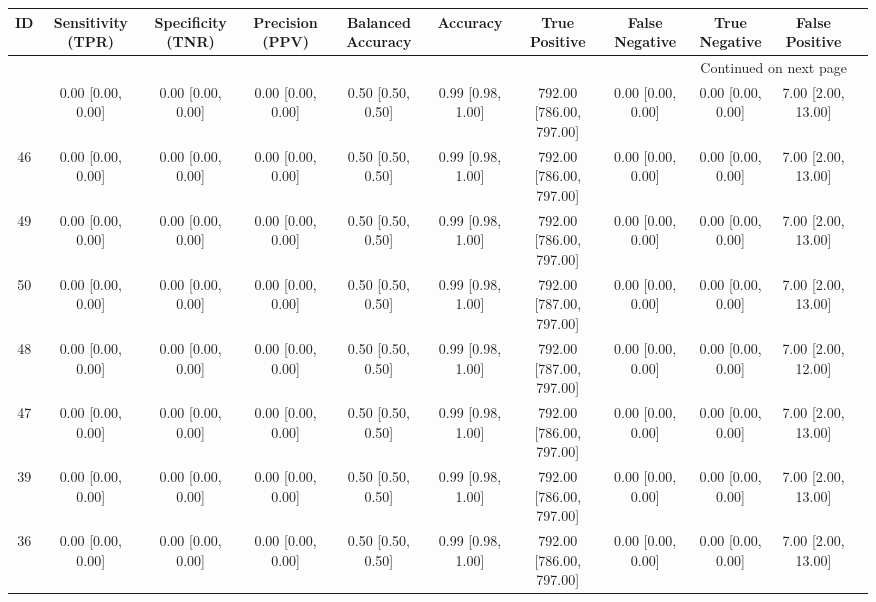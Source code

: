 \documentclass[8pt]{article}
\begin{document}
\begin{center}
\begin{footnotesize}
\begin{longtable}{|ccccccccccc|}
\toprule
 ID &  Sensitivity (TPR) &  Specificity (TNR) &    Precision (PPV) &  Balanced Accuracy &           Accuracy &            True Positive &        False Negative &      True Negative &      False Positive \\
\midrule
\endhead
\midrule
\multicolumn{10}{r}{{Continued on next page}} \\
\midrule
\endfoot

\bottomrule
\endlastfoot
 45 &  0.00 [0.00, 0.00] &  0.00 [0.00, 0.00] &  0.00 [0.00, 0.00] &  0.50 [0.50, 0.50] &  0.99 [0.98, 1.00] &  792.00 [786.00, 797.00] &     0.00 [0.00, 0.00] &  0.00 [0.00, 0.00] &  7.00 [2.00, 13.00] \\
 46 &  0.00 [0.00, 0.00] &  0.00 [0.00, 0.00] &  0.00 [0.00, 0.00] &  0.50 [0.50, 0.50] &  0.99 [0.98, 1.00] &  792.00 [786.00, 797.00] &     0.00 [0.00, 0.00] &  0.00 [0.00, 0.00] &  7.00 [2.00, 13.00] \\
 49 &  0.00 [0.00, 0.00] &  0.00 [0.00, 0.00] &  0.00 [0.00, 0.00] &  0.50 [0.50, 0.50] &  0.99 [0.98, 1.00] &  792.00 [786.00, 797.00] &     0.00 [0.00, 0.00] &  0.00 [0.00, 0.00] &  7.00 [2.00, 13.00] \\
 50 &  0.00 [0.00, 0.00] &  0.00 [0.00, 0.00] &  0.00 [0.00, 0.00] &  0.50 [0.50, 0.50] &  0.99 [0.98, 1.00] &  792.00 [787.00, 797.00] &     0.00 [0.00, 0.00] &  0.00 [0.00, 0.00] &  7.00 [2.00, 13.00] \\
 48 &  0.00 [0.00, 0.00] &  0.00 [0.00, 0.00] &  0.00 [0.00, 0.00] &  0.50 [0.50, 0.50] &  0.99 [0.98, 1.00] &  792.00 [787.00, 797.00] &     0.00 [0.00, 0.00] &  0.00 [0.00, 0.00] &  7.00 [2.00, 12.00] \\
 47 &  0.00 [0.00, 0.00] &  0.00 [0.00, 0.00] &  0.00 [0.00, 0.00] &  0.50 [0.50, 0.50] &  0.99 [0.98, 1.00] &  792.00 [786.00, 797.00] &     0.00 [0.00, 0.00] &  0.00 [0.00, 0.00] &  7.00 [2.00, 13.00] \\
 39 &  0.00 [0.00, 0.00] &  0.00 [0.00, 0.00] &  0.00 [0.00, 0.00] &  0.50 [0.50, 0.50] &  0.99 [0.98, 1.00] &  792.00 [786.00, 797.00] &     0.00 [0.00, 0.00] &  0.00 [0.00, 0.00] &  7.00 [2.00, 13.00] \\
 36 &  0.00 [0.00, 0.00] &  0.00 [0.00, 0.00] &  0.00 [0.00, 0.00] &  0.50 [0.50, 0.50] &  0.99 [0.98, 1.00] &  792.00 [786.00, 797.00] &     0.00 [0.00, 0.00] &  0.00 [0.00, 0.00] &  7.00 [2.00, 13.00] \\

\end{longtable}
\end{footnotesize}
\end{center}
\end{document}
